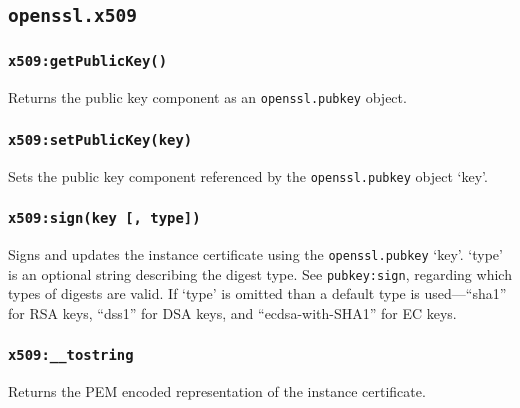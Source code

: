 \documentclass[11pt, oneside]{memoir}
\newcommand*{\fn}[1]{\texttt{#1}\xspace}
\newcommand*{\module}[1]{\texttt{#1}\xspace}
\newcounter{toccols}
\newenvironment{Module}[1]{
	\subsection{\texttt{#1}}
	\addtocontents{toc}{
		\protect\begin{multicols}{\value{toccols}}
	}
}{
	\addtocontents{toc}{\protect\end{multicols}}
}
\begin{document}
\begin{Module}{openssl.x509}
\subsubsection[\fn{x509:getPublicKey}]{\fn{x509:getPublicKey()}}

Returns the public key component as an \module{openssl.pubkey} object.

\subsubsection[\fn{x509:setPublicKey}]{\fn{x509:setPublicKey(key)}}

Sets the public key component referenced by the \module{openssl.pubkey} object `key'.

\subsubsection[\fn{x509:sign}]{\fn{x509:sign(key [, type])}}

Signs and updates the instance certificate using the \module{openssl.pubkey} `key'. `type' is an optional string describing the digest type. See \module{pubkey:sign}, regarding which types of digests are valid. If `type' is omitted than a default type is used---``sha1'' for RSA keys, ``dss1'' for DSA keys, and ``ecdsa-with-SHA1'' for EC keys.

\subsubsection[\fn{x509:\_\_tostring}]{\fn{x509:\_\_tostring}}

Returns the PEM encoded representation of the instance certificate.

\end{Module}
\end{document}
